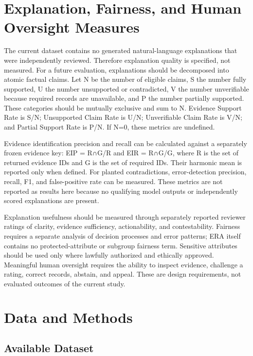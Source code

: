 \documentclass[
  10pt,
  runningheads]{llncs}
\begin{document}
\section{Explanation, Fairness, and Human Oversight
Measures}\label{explanation-fairness-and-human-oversight-measures}

The current dataset contains no generated natural-language explanations
that were independently reviewed. Therefore explanation quality is
specified, not measured. For a future evaluation, explanations should be
decomposed into atomic factual claims. Let N be the number of eligible
claims, S the number fully supported, U the number unsupported or
contradicted, V the number unverifiable because required records are
unavailable, and P the number partially supported. These categories
should be mutually exclusive and sum to N. Evidence Support Rate is S/N;
Unsupported Claim Rate is U/N; Unverifiable Claim Rate is V/N; and
Partial Support Rate is P/N. If N=0, these metrics are undefined.

Evidence identification precision and recall can be calculated against a
separately frozen evidence key: EIP =
\textbar R∩G\textbar/\textbar R\textbar{} and EIR =
\textbar R∩G\textbar/\textbar G\textbar, where R is the set of returned
evidence IDs and G is the set of required IDs. Their harmonic mean is
reported only when defined. For planted contradictions, error-detection
precision, recall, F1, and false-positive rate can be measured. These
metrics are not reported as results here because no qualifying model
outputs or independently scored explanations are present.

Explanation usefulness should be measured through separately reported
reviewer ratings of clarity, evidence sufficiency, actionability, and
contestability. Fairness requires a separate analysis of decision
processes and error patterns; ERA itself contains no protected-attribute
or subgroup fairness term. Sensitive attributes should be used only
where lawfully authorized and ethically approved. Meaningful human
oversight requires the ability to inspect evidence, challenge a rating,
correct records, abstain, and appeal. These are design requirements, not
evaluated outcomes of the current study.

\section{Data and Methods}\label{data-and-methods}

\subsection{Available Dataset}\label{available-dataset}
\end{document}
